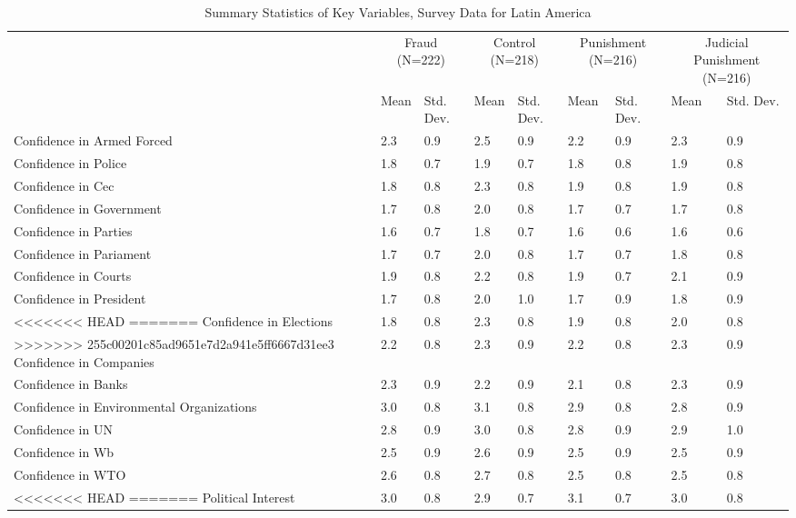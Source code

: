 \begin{table}

\caption{Summary Statistics of Key Variables, Survey Data for Latin America}
\centering
\begin{tabular}[t]{llllllllll}
\toprule
\multicolumn{2}{c}{ } & \multicolumn{2}{c}{Fraud (N=222)} & \multicolumn{2}{c}{Control (N=218)} & \multicolumn{2}{c}{Punishment (N=216)} & \multicolumn{2}{c}{Judicial Punishment (N=216)} \\
\cmidrule(l{3pt}r{3pt}){3-4} \cmidrule(l{3pt}r{3pt}){5-6} \cmidrule(l{3pt}r{3pt}){7-8} \cmidrule(l{3pt}r{3pt}){9-10}
  &    & Mean & Std. Dev. & Mean  & Std. Dev.  & Mean   & Std. Dev.   & Mean    & Std. Dev.   \\
\midrule
Confidence in Armed Forced &  & 2.3 & 0.9 & 2.5 & 0.9 & 2.2 & 0.9 & 2.3 & 0.9\\
Confidence in Police &  & 1.8 & 0.7 & 1.9 & 0.7 & 1.8 & 0.8 & 1.9 & 0.8\\
Confidence in Cec &  & 1.8 & 0.8 & 2.3 & 0.8 & 1.9 & 0.8 & 1.9 & 0.8\\
Confidence in Government &  & 1.7 & 0.8 & 2.0 & 0.8 & 1.7 & 0.7 & 1.7 & 0.8\\
Confidence in Parties &  & 1.6 & 0.7 & 1.8 & 0.7 & 1.6 & 0.6 & 1.6 & 0.6\\
Confidence in Pariament &  & 1.7 & 0.7 & 2.0 & 0.8 & 1.7 & 0.7 & 1.8 & 0.8\\
Confidence in Courts &  & 1.9 & 0.8 & 2.2 & 0.8 & 1.9 & 0.7 & 2.1 & 0.9\\
Confidence in President &  & 1.7 & 0.8 & 2.0 & 1.0 & 1.7 & 0.9 & 1.8 & 0.9\\
<<<<<<< HEAD
=======
Confidence in Elections &  & 1.8 & 0.8 & 2.3 & 0.8 & 1.9 & 0.8 & 2.0 & 0.8\\
>>>>>>> 255c00201c85ad9651e7d2a941e5ff6667d31ee3
Confidence in Companies &  & 2.2 & 0.8 & 2.3 & 0.9 & 2.2 & 0.8 & 2.3 & 0.9\\
Confidence in Banks &  & 2.3 & 0.9 & 2.2 & 0.9 & 2.1 & 0.8 & 2.3 & 0.9\\
Confidence in Environmental Organizations &  & 3.0 & 0.8 & 3.1 & 0.8 & 2.9 & 0.8 & 2.8 & 0.9\\
Confidence in UN &  & 2.8 & 0.9 & 3.0 & 0.8 & 2.8 & 0.9 & 2.9 & 1.0\\
Confidence in Wb &  & 2.5 & 0.9 & 2.6 & 0.9 & 2.5 & 0.9 & 2.5 & 0.9\\
Confidence in WTO &  & 2.6 & 0.8 & 2.7 & 0.8 & 2.5 & 0.8 & 2.5 & 0.8\\
<<<<<<< HEAD
=======
Political Interest &  & 3.0 & 0.8 & 2.9 & 0.7 & 3.1 & 0.7 & 3.0 & 0.8\\

\end{tabular}
\end{table}
